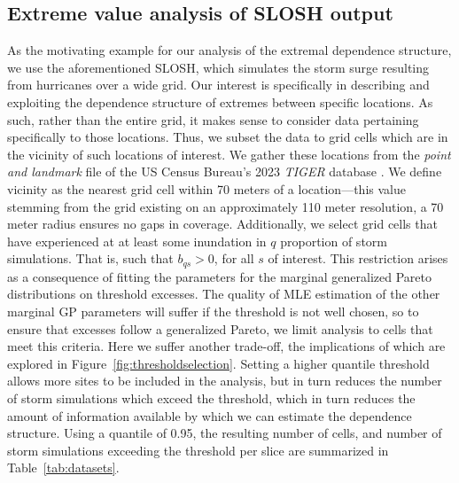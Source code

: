 \subsection{Extreme value analysis of SLOSH output\label{sec:slosh}}
As the motivating example for our analysis of the extremal dependence structure, we 
    use the aforementioned SLOSH, which simulates the storm surge resulting 
    from hurricanes over a wide grid.  Our interest is specifically in describing 
    and exploiting the dependence structure of extremes between specific locations.  
    As such, rather than the entire grid, it makes sense to consider data pertaining
    specifically to those locations. 
    Thus, we subset the data to grid cells which are in the vicinity of such locations 
    of interest.  We gather these locations from the \emph{point and landmark} file 
    of the US Census Bureau's 2023 \emph{TIGER} database \citep{tiger}.
    We define vicinity as the nearest grid cell within 70 meters of a location---this 
    value stemming from the grid existing on an approximately 110 meter resolution, a 
    70 meter radius ensures no gaps in coverage.
    Additionally, we select grid cells that have experienced at at least some inundation 
    in $q$ proportion of storm simulations.  That is, such that $b_{qs} > 0$, for all 
    $s$ of interest.  This restriction arises as a consequence of fitting the parameters 
    for the marginal generalized Pareto distributions on threshold excesses.
    The quality of MLE estimation of the other marginal GP parameters will suffer if the
    threshold is not well chosen, so to ensure that excesses follow a generalized Pareto,
    we limit analysis to cells that meet this criteria.
    Here we suffer another trade-off, the implications of which are explored in 
    Figure~\ref{fig:thresholdselection}.  Setting a higher quantile threshold allows more 
    sites to be included in the analysis, but in turn reduces the number of storm 
    simulations which exceed the threshold, which in turn reduces the amount of 
    information available by which we can estimate the dependence structure. Using a 
    quantile of \num{0.95}, the resulting number of cells, and number of storm simulations
    exceeding the threshold per slice are summarized in Table~\ref{tab:datasets}.

